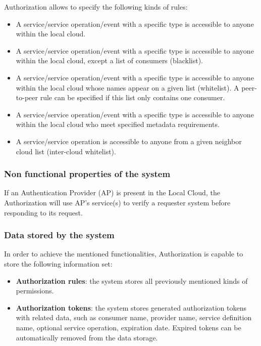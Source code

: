 \documentclass[a4paper]{arrowhead}
\begin{document}
Authorization allows to specify the following kinds of rules:

\begin{itemize}
    \item A service/service operation/event with a specific type  is accessible to anyone within the local cloud.
    \item A service/service operation/event with a specific type is accessible to anyone within the local cloud, except a list of consumers (blacklist).
    \item A service/service operation/event with a specific type is accessible to anyone within the local cloud whose names appear on a given list (whitelist). A peer-to-peer rule can be specified if this list only contains one consumer.
    \item A service/service operation/event with a specific type is accessible to anyone within the local cloud who meet specified metadata requirements.
    \item A service/service operation is accessible to anyone from a given neighbor cloud list (inter-cloud whitelist).
\end{itemize}

\subsubsection {Non functional properties of the system}
If an Authentication Provider (AP) is present in the Local Cloud, the Authorization will use AP's service(s) to verify a requester system before responding to its request. 

\subsubsection {Data stored by the system}
In order to achieve the mentioned functionalities, Authorization is capable to store the following information set:

\begin{itemize}
    \item \textbf{Authorization rules}: the system stores all previously mentioned kinds of permissions.
    \item \textbf{Authorization tokens}: the system stores generated authorization tokens with related data, such as consumer name, provider name, service definition name, optional service operation, expiration date. Expired tokens can be automatically removed from the data storage.
\end{itemize}
\end{document}
